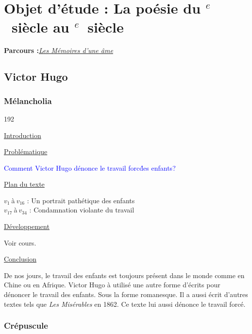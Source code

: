\documentclass[12pt,a4paper]{article}
\begin{document}
\setcounter{tocdepth}{4}								%
\renewcommand{\contentsname}{Sommaire}					%
\tableofcontents										%
\newpage
		\section[Les M\'emoires d'une \^ame]{Objet d'\'etude : La po\'esie du \textsc{}$^{e}$~siècle au \textsc{}$^{e}$~siècle}
		\textbf{Parcours :}\textit{\underline{Les M\'emoires d'une \^ame}}
			\subsection{Victor Hugo}
				\subsubsection{M\'elancholia}
\begin{dingautolist}{192}

\item \underline{Introduction} \par


\item \underline{Probl\'ematique }\par
	\textcolor{blue}{Comment Victor Hugo d\'enonce le travail forc\' des enfants?}
\item \underline{Plan du texte} \par
		$v_{1}~$\`a$~v_{16}$ : Un portrait path\'etique des enfants\\
        $v_{17}~$\`a$~v_{34}$ : Condamnation violante du travail 
	

\item \underline{D\'eveloppement} \par
	Voir cours.

\item \underline{Conclusion} \par
	De nos jours, le travail des enfants est toujours pr\'esent dans le monde comme en Chine ou en Afrique. Victor Hugo \`a utilis\'e une autre forme d'\'ecrits pour d\'enoncer le travail des enfants. Sous la forme romanesque. Il a aussi \'ecrit d'autres textes tels que \textit{Les Mis\'erables} en 1862. Ce texte lui aussi d\'enonce le travail forc\'e.


\end{dingautolist}
 \newpage

				\subsubsection{Cr\'epuscule}
\end{document}
